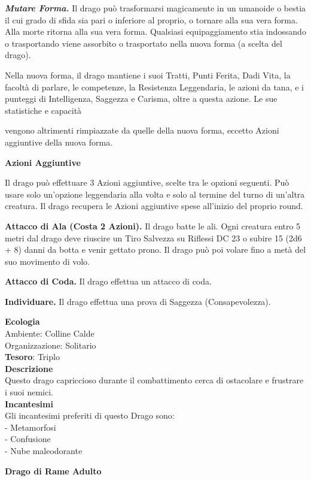 \begin{multicols}{2}
	\textit{\textbf{Mutare Forma.}} Il drago può trasformarsi magicamente in un umanoide o bestia il cui grado di sfida sia pari o inferiore al proprio, o tornare alla sua vera forma. Alla morte ritorna alla sua vera forma. Qualsiasi equipaggiamento stia indossando o trasportando viene assorbito o trasportato nella nuova forma (a scelta del drago).

	Nella nuova forma, il drago mantiene i suoi Tratti, Punti Ferita, Dadi Vita, la facoltà di parlare, le competenze, la Resistenza Leggendaria, le azioni da tana, e i punteggi di Intelligenza, Saggezza e Carisma, oltre a questa azione. Le sue statistiche e capacità

	vengono altrimenti rimpiazzate da quelle della nuova forma, eccetto Azioni aggiuntive della nuova forma.

	\textbf{Azioni Aggiuntive}

	Il drago può effettuare 3 Azioni aggiuntive, scelte tra le opzioni seguenti. Può usare solo un'opzione leggendaria alla volta e solo al termine del turno di un'altra creatura. Il drago recupera le Azioni aggiuntive spese all'inizio del proprio round.

	\textbf{Attacco di Ala (Costa 2 Azioni).} Il drago batte le ali. Ogni creatura entro 5 metri dal drago deve riuscire un Tiro Salvezza su Riflessi DC 23 o subire 15 (2d6 + 8) danni da botta e venir gettato prono. Il drago può poi volare fino a metà del suo movimento di volo.

	\textbf{Attacco di Coda.} Il drago effettua un attacco di coda.

	\textbf{Individuare.} Il drago effettua una prova di Saggezza (Consapevolezza).

	\textbf{Ecologia}\\
	Ambiente: Colline Calde\\
	Organizzazione: Solitario\\
	\textbf{Tesoro}: Triplo\\
	\textbf{Descrizione}\\
	Questo drago capriccioso durante il combattimento cerca di ostacolare e frustrare i suoi nemici.\\
	\textbf{Incantesimi}\\
	Gli incantesimi preferiti di questo Drago sono:\\
	- Metamorfosi\\
	- Confusione\\
	- Nube maleodorante


	\medskip{}\textbf{Drago di Rame Adulto}


\end{multicols}
